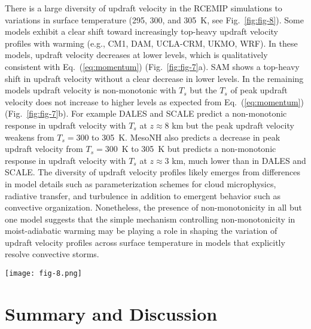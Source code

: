 \documentclass[draft]{ametsocV6.1}
\begin{document}
There is a large diversity of updraft velocity in the RCEMIP simulations to variations in surface temperature (295, 300, and 305~K, see Fig.~\ref{fig:fig-8}). Some models exhibit a clear shift toward increasingly top-heavy updraft velocity profiles with warming (e.g., CM1, DAM, UCLA-CRM, UKMO, WRF). In these models, updraft velocity decreases at lower levels, which is qualitatively consistent with Eq.~(\ref{eq:momentum}) (Fig.~\ref{fig:fig-7}a). SAM shows a top-heavy shift in updraft velocity without a clear decrease in lower levels. In the remaining models updraft velocity is non-monotonic with $T_s$ but the $T_s$ of peak updraft velocity does not increase to higher levels as expected from Eq.~(\ref{eq:momentum}) (Fig.~\ref{fig:fig-7}b). For example DALES and SCALE predict a non-monotonic response in updraft velocity with $T_s$ at $z\approx8$ km but the peak updraft velocity weakens from $T_s=300$ to 305~K. MesoNH also predicts a decrease in peak updraft velocity from $T_s=300$~K to 305~K but predicts a non-monotonic response in updraft velocity with $T_s$ at $z\approx3$ km, much lower than in DALES and SCALE. The diversity of updraft velocity profiles likely emerges from differences in model details such as parameterization schemes for cloud microphysics, radiative transfer, and turbulence in addition to emergent behavior such as convective organization. Nonetheless, the presence of non-monotonicity in all but one model suggests that the simple mechanism controlling non-monotonicity in moist-adiabatic warming may be playing a role in shaping the variation of updraft velocity profiles across surface temperature in models that explicitly resolve convective storms.

\begin{figure*}[htbp]
 \centering
 \texttt{[image: fig-8.png]}\\
 \caption{Updraft velocity from 9 cloud-resolving models (CM1, DALES, DAM, MesoNH, SAM-CRM, SCALE, UCLA-CRM, UKMO-CASIM, and WRF) that participated in RCEMIP \citep{wing2018}. The simulations are on a 100~km $\times$ 100~km periodic domain for uniform sea surface temperatures set to 295 (blue), 300 (black), and 305~K (red). Updraft velocity at each level is the mean of vertical velocities $w$ that exceed the 99.9th percentile ($w_{>99.9}$, defined separately for each model).}\label{fig:fig-8}
\end{figure*}

\section{Summary and Discussion}
\end{document}
